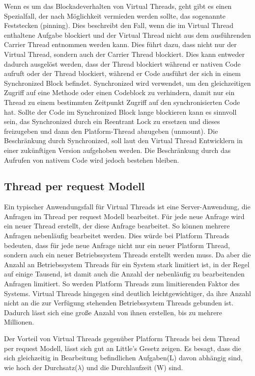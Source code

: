 \documentclass[fontsize=12pt,paper=a4,twoside=semi,parskip=half-,headsepline,headinclude]{scrreprt}
\begin{document}
Wenn es um das Blockadeverhalten von Virtual Threads, geht gibt es einen Spezialfall, der nach Möglichkeit vermieden werden sollte, das sogenannte Feststecken (pinning). Dies beschreibt den Fall, wenn die im Virtual Thread enthaltene Aufgabe blockiert und der Virtual Thread nicht aus dem ausführenden Carrier Thread entnommen werden kann. Dies führt dazu, dass nicht nur der Virtual Thread, sondern auch der Carrier Thread blockiert. Dies kann entweder dadurch ausgelöst werden, dass der Thread blockiert während er nativen Code aufruft oder der Thread blockiert, während er Code ausführt der sich in einem Synchronized Block befindet. Synchronized wird verwendet, um den gleichzeitigen Zugriff auf eine Methode oder einen Codeblock zu verhindern, damit nur ein Thread zu einem bestimmten Zeitpunkt Zugriff auf den synchronisierten Code hat. Sollte der Code im Synchronized Block lange blockieren kann es sinnvoll sein, das Synchronized durch ein Reentrant Lock zu ersetzen und dieses freizugeben und dann den Platform-Thread abzugeben (unmount). Die Beschränkung durch Synchronized, soll laut den Virtual Thread Entwicklern in einer zukünftigen Version aufgehoben werden\cite{Chilano2024}. Die Beschränkung durch das Aufrufen von nativem Code wird jedoch bestehen bleiben.\cite{Bateman2024}

\subsection{Thread per request Modell}

Ein typischer Anwendungsfall für Virtual Threads ist eine Server-Anwendung, die Anfragen im Thread per request Modell bearbeitet. Für jede neue Anfrage wird ein neuer Thread erstellt, der diese Anfrage bearbeitet. So können mehrere Anfragen nebenläufig bearbeitet werden. Dies würde bei Platform Threads bedeuten, dass für jede neue Anfrage nicht nur ein neuer Platform Thread, sondern auch ein neuer Betriebssystem Threads erstellt werden muss. Da aber die Anzahl an Betriebssystem Threads für ein System stark limitiert ist, in der Regel auf einige Tausend, ist damit auch die Anzahl der nebenläufig zu bearbeitenden Anfragen limitiert. So werden Platform Threads zum limitierenden Faktor des Systems. Virtual Threads hingegen sind deutlich leichtgewichtiger, da ihre Anzahl nicht an die zur Verfügung stehenden Betriebssystem Threads gebunden ist. Dadurch lässt sich eine große Anzahl von ihnen erstellen, bis zu mehrere Millionen.

Der Vorteil von Virtual Threads gegenüber Platform Threads bei dem Thread per request Modell, lässt sich gut an Little's Gesetz \cite{Little1961} zeigen. Es besagt, dass die sich gleichzeitig in Bearbeitung befindlichen Aufgaben(L) davon abhängig sind, wie hoch der Durchsatz($\lambda$) und die Durchlaufzeit (W) sind.
\end{document}
